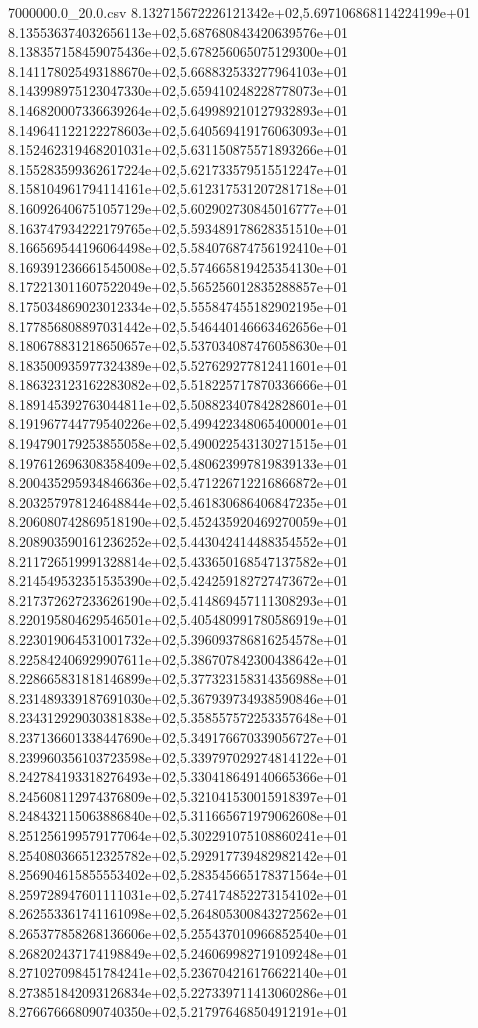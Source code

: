 \begin{filecontents*}{7000000.0_20.0.csv}
8.132715672226121342e+02,5.697106868114224199e+01
8.135536374032656113e+02,5.687680843420639576e+01
8.138357158459075436e+02,5.678256065075129300e+01
8.141178025493188670e+02,5.668832533277964103e+01
8.143998975123047330e+02,5.659410248228778073e+01
8.146820007336639264e+02,5.649989210127932893e+01
8.149641122122278603e+02,5.640569419176063093e+01
8.152462319468201031e+02,5.631150875571893266e+01
8.155283599362617224e+02,5.621733579515512247e+01
8.158104961794114161e+02,5.612317531207281718e+01
8.160926406751057129e+02,5.602902730845016777e+01
8.163747934222179765e+02,5.593489178628351510e+01
8.166569544196064498e+02,5.584076874756192410e+01
8.169391236661545008e+02,5.574665819425354130e+01
8.172213011607522049e+02,5.565256012835288857e+01
8.175034869023012334e+02,5.555847455182902195e+01
8.177856808897031442e+02,5.546440146663462656e+01
8.180678831218650657e+02,5.537034087476058630e+01
8.183500935977324389e+02,5.527629277812411601e+01
8.186323123162283082e+02,5.518225717870336666e+01
8.189145392763044811e+02,5.508823407842828601e+01
8.191967744779540226e+02,5.499422348065400001e+01
8.194790179253855058e+02,5.490022543130271515e+01
8.197612696308358409e+02,5.480623997819839133e+01
8.200435295934846636e+02,5.471226712216866872e+01
8.203257978124648844e+02,5.461830686406847235e+01
8.206080742869518190e+02,5.452435920469270059e+01
8.208903590161236252e+02,5.443042414488354552e+01
8.211726519991328814e+02,5.433650168547137582e+01
8.214549532351535390e+02,5.424259182727473672e+01
8.217372627233626190e+02,5.414869457111308293e+01
8.220195804629546501e+02,5.405480991780586919e+01
8.223019064531001732e+02,5.396093786816254578e+01
8.225842406929907611e+02,5.386707842300438642e+01
8.228665831818146899e+02,5.377323158314356988e+01
8.231489339187691030e+02,5.367939734938590846e+01
8.234312929030381838e+02,5.358557572253357648e+01
8.237136601338447690e+02,5.349176670339056727e+01
8.239960356103723598e+02,5.339797029274814122e+01
8.242784193318276493e+02,5.330418649140665366e+01
8.245608112974376809e+02,5.321041530015918397e+01
8.248432115063886840e+02,5.311665671979062608e+01
8.251256199579177064e+02,5.302291075108860241e+01
8.254080366512325782e+02,5.292917739482982142e+01
8.256904615855553402e+02,5.283545665178371564e+01
8.259728947601111031e+02,5.274174852273154102e+01
8.262553361741161098e+02,5.264805300843272562e+01
8.265377858268136606e+02,5.255437010966852540e+01
8.268202437174198849e+02,5.246069982719109248e+01
8.271027098451784241e+02,5.236704216176622140e+01
8.273851842093126834e+02,5.227339711413060286e+01
8.276676668090740350e+02,5.217976468504912191e+01

\end{filecontents*}
